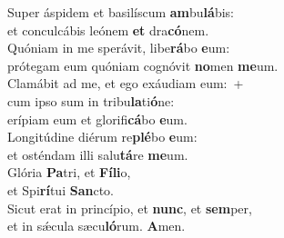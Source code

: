 \oddverse Super áspidem et basilíscum \textbf{am}bu\textbf{lá}bis:~\*\\
\oddverse et conculcábis leónem \textbf{et} dra\textbf{có}nem.\\
\evenverse Quóniam in me sperávit, libe\textbf{rá}bo \textbf{e}um:~\*\\
\evenverse prótegam eum quóniam cognóvit \textbf{no}men \textbf{me}um.\\
\oddverse Clamábit ad me, et ego exáudiam eum:~+\\
\oddverse  cum ipso sum in tribu\textbf{la}ti\textbf{ó}ne:~\*\\
\oddverse erípiam eum et glorifi\textbf{cá}bo \textbf{e}um.\\
\evenverse Longitúdine diérum re\textbf{plé}bo \textbf{e}um:~\*\\
\evenverse et osténdam illi salu\textbf{tá}re \textbf{me}um.\\
\oddverse Glória \textbf{Pa}tri, et \textbf{Fí}\textbf{li}o,~\*\\
\oddverse et Spi\textbf{rí}tui \textbf{San}cto.\\
\evenverse Sicut erat in princípio, et \textbf{nunc}, et \textbf{sem}per,~\*\\
\evenverse et in sǽcula sæcu\textbf{ló}rum. \textbf{A}men.\\
